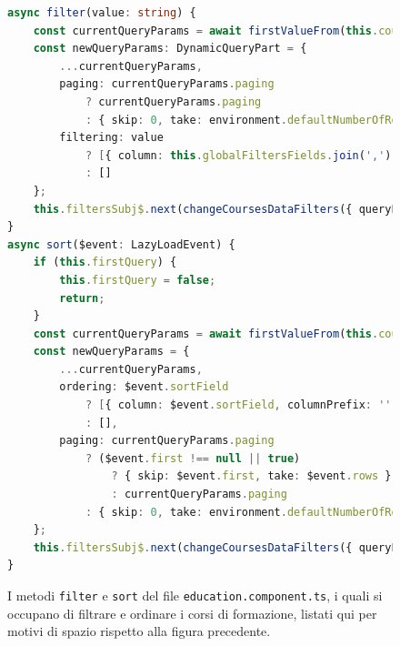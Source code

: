 \begin{figure}[H]
\centering
\begin{lstlisting}[language=TypeScript, linewidth=20cm, basicstyle=\tiny]
async filter(value: string) {
    const currentQueryParams = await firstValueFrom(this.coursesDataFilters$.pipe(take(1)));
    const newQueryParams: DynamicQueryPart = {
        ...currentQueryParams,
        paging: currentQueryParams.paging
            ? currentQueryParams.paging
            : { skip: 0, take: environment.defaultNumberOfRowsPerPage },
        filtering: value
            ? [{ column: this.globalFiltersFields.join(','), predicate: 'LK', value, kind: 'STRING' } as Filtering]
            : []
    };
    this.filtersSubj$.next(changeCoursesDataFilters({ queryParams: newQueryParams, _id: getRandomId() }));
}
async sort($event: LazyLoadEvent) {
    if (this.firstQuery) {
        this.firstQuery = false;
        return;
    }
    const currentQueryParams = await firstValueFrom(this.coursesDataFilters$.pipe(take(1)));
    const newQueryParams = {
        ...currentQueryParams,
        ordering: $event.sortField
            ? [{ column: $event.sortField, columnPrefix: '', descending: $event.sortOrder > 0}]
            : [],
        paging: currentQueryParams.paging
            ? ($event.first !== null || true)
                ? { skip: $event.first, take: $event.rows }
                : currentQueryParams.paging
            : { skip: 0, take: environment.defaultNumberOfRowsPerPage }
    };
    this.filtersSubj$.next(changeCoursesDataFilters({ queryParams: newQueryParams, _id: getRandomId() }));
}
\end{lstlisting}
\caption{\label{fig:sort and filter}I metodi \texttt{filter} e \texttt{sort} del file \texttt{education.component.ts}, i quali si occupano di filtrare e ordinare i corsi di formazione, listati qui per motivi di spazio rispetto alla figura precedente.}
\end{figure}

